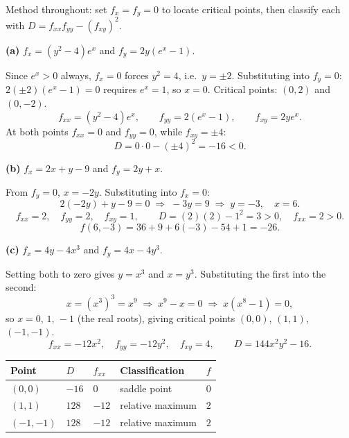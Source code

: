 \begin{solution}
Method throughout: set $f_x=f_y=0$ to locate critical points, then classify each
with $D=f_{xx}f_{yy}-(f_{xy})^{2}$.

\medskip
\textbf{(a)} $f_x=(y^{2}-4)e^{x}$ and $f_y=2y(e^{x}-1)$.

Since $e^{x}>0$ always, $f_x=0$ forces $y^{2}=4$, i.e.\ $y=\pm2$. Substituting
into $f_y=0$: $2(\pm2)(e^{x}-1)=0$ requires $e^{x}=1$, so $x=0$. Critical
points: $(0,2)$ and $(0,-2)$.
\[
f_{xx}=(y^{2}-4)e^{x},\qquad f_{yy}=2(e^{x}-1),\qquad f_{xy}=2ye^{x}.
\]
At both points $f_{xx}=0$ and $f_{yy}=0$, while $f_{xy}=\pm4$:
\[
D=0\cdot 0-(\pm4)^{2}=-16<0 .
\]

\medskip
\textbf{(b)} $f_x=2x+y-9$ and $f_y=2y+x$.

From $f_y=0$, $x=-2y$. Substituting into $f_x=0$:
\[
2(-2y)+y-9=0 \;\Longrightarrow\; -3y=9 \;\Longrightarrow\; y=-3,\quad x=6 .
\]
\[
f_{xx}=2,\quad f_{yy}=2,\quad f_{xy}=1,
\qquad D=(2)(2)-1^{2}=3>0,\quad f_{xx}=2>0 .
\]
\[
f(6,-3)=36+9+6(-3)-54+1=-26 .
\]

\medskip
\textbf{(c)} $f_x=4y-4x^{3}$ and $f_y=4x-4y^{3}$.

Setting both to zero gives $y=x^{3}$ and $x=y^{3}$. Substituting the first into
the second:
\[
x=(x^{3})^{3}=x^{9} \;\Longrightarrow\; x^{9}-x=0
\;\Longrightarrow\; x(x^{8}-1)=0 ,
\]
so $x=0,\,1,\,-1$ (the real roots), giving critical points $(0,0)$, $(1,1)$,
$(-1,-1)$.
\[
f_{xx}=-12x^{2},\quad f_{yy}=-12y^{2},\quad f_{xy}=4,
\qquad D=144x^{2}y^{2}-16 .
\]

\begin{center}
\small\sffamily
\begin{tabular}{@{}C{2.4cm} C{2.2cm} C{2.2cm} C{3.2cm} C{2.0cm}@{}}
\toprule
Point & $D$ & $f_{xx}$ & Classification & $f$ \\
\midrule
$(0,0)$   & $-16$ & $0$   & saddle point      & $0$ \\
$(1,1)$   & $128$ & $-12$ & relative maximum  & $2$ \\
$(-1,-1)$ & $128$ & $-12$ & relative maximum  & $2$ \\
\bottomrule
\end{tabular}
\end{center}


\end{solution}
